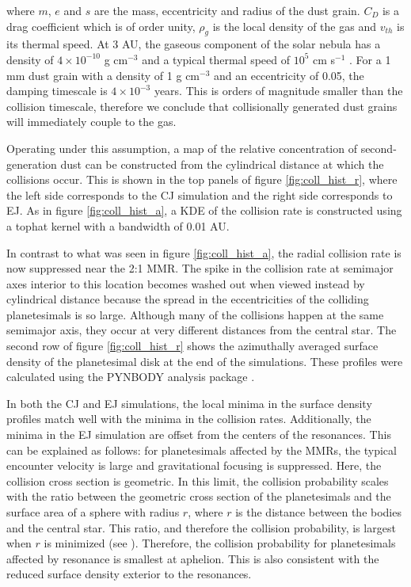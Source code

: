 \documentclass[onecolumn]{aastex63}
\begin{document}
where $m$, $e$ and $s$ are the mass, eccentricity and radius of the dust grain. $C_{D}$ is a drag coefficient which is of order unity, $
\rho_{g}$ is the local density of the gas and $v_{th}$ is its thermal speed. At 3 AU, the gaseous component of the solar nebula has a 
density of $4 \times 10^{-10}$ g cm$^{-3}$ and a typical thermal speed of $10^{5}$ cm s$^{-1}$ \citep{1981PThPS..70...35H}. For a 1 
mm dust grain with a density of 1 g cm$^{-3}$ and an eccentricity of 0.05, the damping timescale is $4 \times 10^{-3}$ years. This is 
orders of magnitude smaller than the collision timescale, therefore we conclude that collisionally generated dust grains will immediately 
couple to the gas.

Operating under this assumption, a map of the relative concentration of second-generation dust can be constructed from the cylindrical 
distance at which the collisions occur. This is shown in the top panels of figure \ref{fig:coll_hist_r}, where the left side corresponds to the CJ 
simulation and the right side corresponds to EJ. As in figure \ref{fig:coll_hist_a}, a KDE of the collision rate is constructed using a tophat 
kernel with a bandwidth of 0.01 AU.

In contrast to what was seen in figure \ref{fig:coll_hist_a}, the radial collision rate is now suppressed near the 2:1 MMR. The spike in the 
collision rate at semimajor axes interior to this location becomes washed out when viewed instead by cylindrical distance because the 
spread in the eccentricities of the colliding planetesimals is so large. Although many of the collisions happen at the same semimajor axis, 
they occur at very different distances from the central star. The second row of figure \ref{fig:coll_hist_r} shows the azimuthally averaged 
surface density of the planetesimal disk at the end of the simulations. These profiles were calculated using the {\sc PYNBODY} analysis 
package \citep{2013ascl.soft05002P}.

In both the CJ and EJ simulations, the local minima in the surface density profiles match well with the minima in the collision rates. 
Additionally, the minima in the EJ simulation are offset from the centers of the resonances. This can be explained as follows: for 
planetesimals affected by the MMRs, the typical encounter velocity is large and gravitational focusing is suppressed. Here, the collision 
cross section is geometric. In this limit, the collision probability scales with the ratio between the geometric cross section of the 
planetesimals and the surface area of a sphere with radius $r$, where $r$ is the distance between the bodies and the central star. This 
ratio, and therefore the collision probability, is largest when $r$ is minimized (see \citet{2003AJ....125.2692L}). Therefore, the collision 
probability for planetesimals affected by resonance is smallest at aphelion. This is also consistent with the reduced surface density exterior 
to the resonances.
\end{document}
